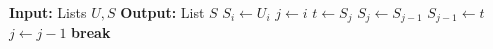 \begin{algorithmic}
    \State \textbf{Input:} Lists $U,S$
    \State \textbf{Output:} List $S$
      \State $S_i \gets U_i$
      \State $j \gets i$
          \State $t \gets S_j$
          \State $S_j \gets S_{j-1}$
          \State $S_{j-1} \gets t$
          \State $j \gets j-1$
        \Else
          \State \textbf{break}
        \EndIf
      \EndWhile
    \EndFor
  \EndProcedure
\end{algorithmic}
